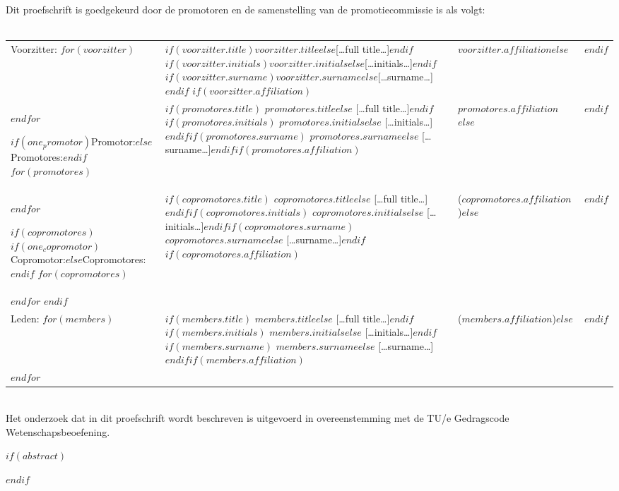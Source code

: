 \documentclass[$if(fontsize)$$fontsize$,$endif$$if(papersize)$twoside,$endif$$for(classoption)$$classoption$$sep$,$endfor$]{$documentclass$}
\begin{document}
\clearpage
\thispagestyle{empty}
\noindent
Dit proefschrift is goedgekeurd door de promotoren en de samenstelling van de
promotiecommissie is als volgt:
\\
\\
\noindent\begin{tabular}{@{}lll}


Voorzitter:
$for(voorzitter)$
& $if(voorzitter.title)$$voorzitter.title$$else$[…full title…]$endif$
$if(voorzitter.initials)$$voorzitter.initials$$else$[…initials…]$endif$
$if(voorzitter.surname)$$voorzitter.surname$$else$[…surname…]$endif$
$if(voorzitter.affiliation)$ & $voorzitter.affiliation$$else$ & $endif$\\
$endfor$

$if(one_promotor)$Promotor:$else$Promotores:$endif$
$for(promotores)$
& $if(promotores.title)$ $promotores.title$$else$ […full title…]$endif$$if(promotores.initials)$ $promotores.initials$$else$ […initials…]$endif$$if(promotores.surname)$ $promotores.surname$$else$ […surname…]$endif$$if(promotores.affiliation)$ & $promotores.affiliation$$else$ & $endif$\\
$endfor$

$if(copromotores)$
$if(one_copromotor)$Copromotor:$else$Copromotores:$endif$
$for(copromotores)$
& $if(copromotores.title)$ $copromotores.title$$else$ […full title…]$endif$$if(copromotores.initials)$ $copromotores.initials$$else$ […initials…]$endif$$if(copromotores.surname)$ $copromotores.surname$$else$ […surname…]$endif$$if(copromotores.affiliation)$ & ($copromotores.affiliation$)$else$ & $endif$\\
$endfor$
$endif$

\\
Leden:
$for(members)$
& $if(members.title)$ $members.title$$else$ […full title…]$endif$$if(members.initials)$ $members.initials$$else$ […initials…]$endif$$if(members.surname)$ $members.surname$$else$ […surname…]$endif$$if(members.affiliation)$ & ($members.affiliation$)$else$ & $endif$\\
$endfor$
\end{tabular}\\

\vfill
\noindent
Het onderzoek dat in dit proefschrift wordt beschreven is uitgevoerd in overeenstemming met de TU/e Gedragscode Wetenschapsbeoefening.
\pagebreak


$if(abstract)$
\begin{abstract}
$abstract$
\end{abstract}
$endif$
\end{document}
